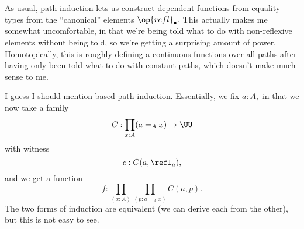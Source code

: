 As usual, path induction lets us construct dependent functions from equality types from the ``canonical'' elements $\op{refl}_\bullet.$ This actually makes me somewhat uncomfortable, in that we're being told what to do with non-reflexive elements without being told, so we're getting a surprising amount of power. Homotopically, this is roughly defining a continuous functions over all paths after having only been told what to do with constant paths, which doesn't make much sense to me.

I guess I should mention based path induction. Essentially, we fix $a:A,$ in that we now take a family
\[C:\prod_{x:A}(a=_Ax)\to\UU\]
with witness
\[c:C(a,\refl_a),\]
and we get a function
\[f:\prod_{(x:A)}\prod_{(p:a=_Ax)}C(a,p).\]
The two forms of induction are equivalent (we can derive each from the other), but this is not easy to see.